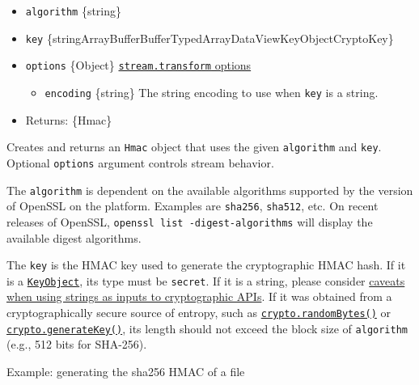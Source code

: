\begin{itemize}
\tightlist
\item
  \texttt{algorithm} \{string\}
\item
  \texttt{key}
  \{string\textbar ArrayBuffer\textbar Buffer\textbar TypedArray\textbar DataView\textbar KeyObject\textbar CryptoKey\}
\item
  \texttt{options} \{Object\}
  \href{stream.md\#new-streamtransformoptions}{\texttt{stream.transform}
  options}

  \begin{itemize}
  \tightlist
  \item
    \texttt{encoding} \{string\} The string encoding to use when
    \texttt{key} is a string.
  \end{itemize}
\item
  Returns: \{Hmac\}
\end{itemize}

Creates and returns an \texttt{Hmac} object that uses the given
\texttt{algorithm} and \texttt{key}. Optional \texttt{options} argument
controls stream behavior.

The \texttt{algorithm} is dependent on the available algorithms
supported by the version of OpenSSL on the platform. Examples are
\texttt{\textquotesingle{}sha256\textquotesingle{}},
\texttt{\textquotesingle{}sha512\textquotesingle{}}, etc. On recent
releases of OpenSSL, \texttt{openssl\ list\ -digest-algorithms} will
display the available digest algorithms.

The \texttt{key} is the HMAC key used to generate the cryptographic HMAC
hash. If it is a \hyperref[class-keyobject]{\texttt{KeyObject}}, its
type must be \texttt{secret}. If it is a string, please consider
\hyperref[using-strings-as-inputs-to-cryptographic-apis]{caveats when
using strings as inputs to cryptographic APIs}. If it was obtained from
a cryptographically secure source of entropy, such as
\hyperref[cryptorandombytessize-callback]{\texttt{crypto.randomBytes()}}
or
\hyperref[cryptogeneratekeytype-options-callback]{\texttt{crypto.generateKey()}},
its length should not exceed the block size of \texttt{algorithm} (e.g.,
512 bits for SHA-256).

Example: generating the sha256 HMAC of a file

